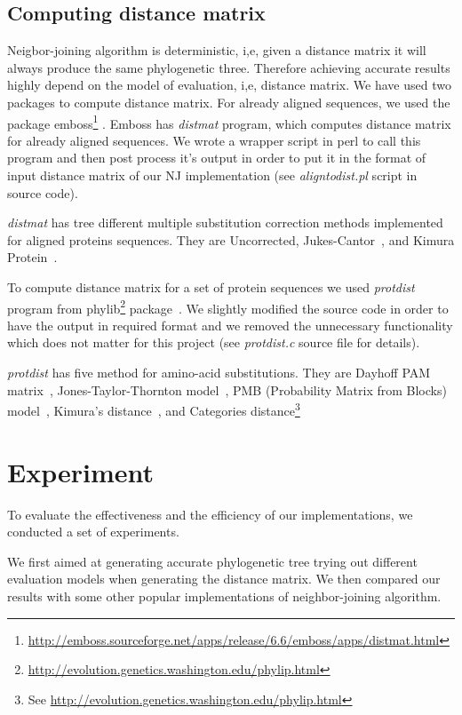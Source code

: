\documentclass[11pt,letterpaper]{article}
\theoremstyle{definition}
\begin{document}
\subsection{Computing distance matrix}

Neigbor-joining algorithm is deterministic, i,e, given a distance matrix it will always produce the same phylogenetic three. Therefore achieving accurate results highly depend on the model of evaluation, i,e, distance matrix.
We have used two packages to compute distance matrix. For already aligned sequences, we used the package emboss\footnote{\url{http://emboss.sourceforge.net/apps/release/6.6/emboss/apps/distmat.html}} \cite{rice2000emboss}. Emboss has \textit{distmat} program, which computes distance matrix for already aligned sequences. We wrote a wrapper script in perl to call this program and then post process it's output in order to put it in the format of input distance matrix of our NJ implementation (see \textit{aligntodist.pl} script in source code).

\textit{distmat} has tree different multiple substitution correction methods implemented for aligned proteins sequences. They are Uncorrected, Jukes-Cantor~\cite{jukes1969evolution}, and Kimura Protein~\cite{kimura1980simple}. 

To compute distance matrix for a set of protein sequences we used \textit{protdist} program from phylib\footnote{\url{http://evolution.genetics.washington.edu/phylip.html}} package~\cite{plotree1989phylip}. We slightly modified the source code in order to have the output in required format and we removed the unnecessary functionality which does not matter for this project (see \textit{protdist.c} source file for details).

\textit{protdist} has five method for amino-acid substitutions. They are Dayhoff PAM matrix~\cite{kosiol2005different}, Jones-Taylor-Thornton model~\cite{jones1992rapid}, PMB (Probability Matrix from Blocks) model~\cite{veerassamy2003transition}, Kimura's distance~\cite{kimura1983rare}, and Categories distance\footnote{See \url{http://evolution.genetics.washington.edu/phylip.html}}

\section{Experiment}

To evaluate the effectiveness and the efficiency of our implementations, we conducted a set of experiments. 

We first aimed at generating accurate phylogenetic tree trying out different evaluation models when generating the distance matrix. We then compared our results with some other popular implementations of neighbor-joining algorithm. 
\end{document}
